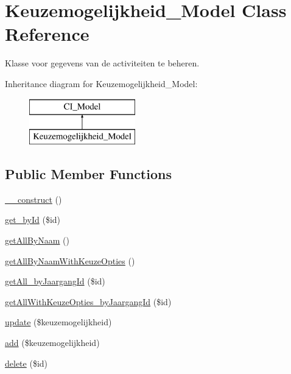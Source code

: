 \hypertarget{class_keuzemogelijkheid___model}{}\section{Keuzemogelijkheid\+\_\+\+Model Class Reference}
\label{class_keuzemogelijkheid___model}


Klasse voor gegevens van de activiteiten te beheren.  


Inheritance diagram for Keuzemogelijkheid\+\_\+\+Model\+:\begin{figure}[H]
\begin{center}
\leavevmode
\includegraphics[height=2.000000cm]{class_keuzemogelijkheid___model}
\end{center}
\end{figure}
\subsection*{Public Member Functions}
\begin{DoxyCompactItemize}
\item 
\mbox{\hyperlink{class_keuzemogelijkheid___model_a095c5d389db211932136b53f25f39685}{\+\_\+\+\_\+construct}} ()
\item 
\mbox{\hyperlink{class_keuzemogelijkheid___model_a98d28a4d9a29d40c5a8aa0176f19a919}{get\+\_\+by\+Id}} (\$id)
\item 
\mbox{\hyperlink{class_keuzemogelijkheid___model_a2b035b1ffd1cbe651b35bb3e53d72c09}{get\+All\+By\+Naam}} ()
\item 
\mbox{\hyperlink{class_keuzemogelijkheid___model_a2762d72d382c5c81da0d0830d5d91805}{get\+All\+By\+Naam\+With\+Keuze\+Opties}} ()
\item 
\mbox{\hyperlink{class_keuzemogelijkheid___model_aa7334b3aaafdacd36e91e44a83e668c3}{get\+All\+\_\+by\+Jaargang\+Id}} (\$id)
\item 
\mbox{\hyperlink{class_keuzemogelijkheid___model_afee956c75c2fe9966783b18602ace19a}{get\+All\+With\+Keuze\+Opties\+\_\+by\+Jaargang\+Id}} (\$id)
\item 
\mbox{\hyperlink{class_keuzemogelijkheid___model_a933a162ba87e58d4cc7eb781fd571a7a}{update}} (\$keuzemogelijkheid)
\item 
\mbox{\hyperlink{class_keuzemogelijkheid___model_ab3ea46c3ea11cbb463eb98238e38c580}{add}} (\$keuzemogelijkheid)
\item 
\mbox{\hyperlink{class_keuzemogelijkheid___model_a2f8258add505482d7f00ea26493a5723}{delete}} (\$id)
\end{DoxyCompactItemize}


